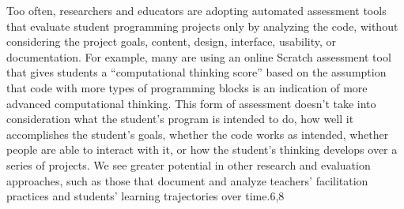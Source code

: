 \documentclass[./main]{subfiles}
\begin{document}
Too often, researchers and educators are adopting automated assessment tools that evaluate student programming projects only by analyzing the code, without considering the project goals, content, design, interface, usability, or documentation. For example, many are using an online Scratch assessment tool that gives students a “computational thinking score” based on the assumption that code with more types of programming blocks is an indication of more advanced computational thinking. This form of assessment doesn’t take into consideration what the student’s program is intended to do, how well it accomplishes the student’s goals, whether the code works as intended, whether people are able to interact with it, or how the student’s thinking develops over a series of projects. We see greater potential in other research and evaluation approaches, such as those that document and analyze teachers’ facilitation practices and students’ learning trajectories over time.6,8
\end{document}
